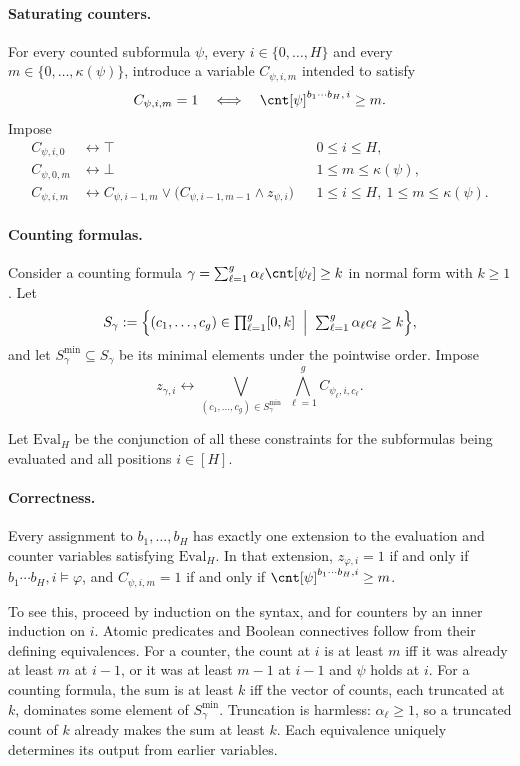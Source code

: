 \paragraph{Saturating counters.}
For every counted subformula $\psi$, every $i\in\{0,\ldots,H\}$ and every
$m\in\{0,\ldots,\kappa(\psi)\}$, introduce a variable $C_{\psi,i,m}$ intended to satisfy
\[
  C_{\psi,i,m}=1 \quad\Longleftrightarrow\quad \cnt[\psi]^{b_1\cdots b_H,\,i}\geq m.
\]
Impose
\begin{align*}
  C_{\psi,i,0} &\leftrightarrow \top && 0\leq i\leq H,\\
  C_{\psi,0,m} &\leftrightarrow \bot && 1\leq m\leq\kappa(\psi),\\
  C_{\psi,i,m} &\leftrightarrow C_{\psi,i-1,m}\lor\bigl(C_{\psi,i-1,m-1}\land z_{\psi,i}\bigr)
  && 1\leq i\leq H,\ 1\leq m\leq\kappa(\psi).
\end{align*}

\paragraph{Counting formulas.}
Consider a counting formula $\gamma=\sum_{\ell=1}^{g}\alpha_\ell\cnt[\psi_\ell]\geq k$ in normal
form with $k\geq 1$. Let
\[
  S_\gamma := \Bigl\{(c_1,\ldots,c_g)\in\textstyle\prod_{\ell=1}^{g}[0,k] \;\Bigm|\;
  \textstyle\sum_{\ell=1}^{g}\alpha_\ell c_\ell\geq k\Bigr\},
\]
and let $S^{\min}_\gamma\subseteq S_\gamma$ be its minimal elements under the pointwise order.
Impose
\begin{equation}\label{eq:bounded-crasp-count}
  z_{\gamma,i}\leftrightarrow
  \bigvee_{(c_1,\ldots,c_g)\in S^{\min}_\gamma}\ \bigwedge_{\ell=1}^{g} C_{\psi_\ell,i,c_\ell}.
\end{equation}

Let $\mathrm{Eval}_H$ be the conjunction of all these constraints for the subformulas being
evaluated and all positions $i\in[H]$.

\paragraph{Correctness.}
Every assignment to $b_1,\ldots,b_H$ has exactly one extension to the evaluation and counter
variables satisfying $\mathrm{Eval}_H$. In that extension, $z_{\varphi,i}=1$ if and only if
$b_1\cdots b_H,i\models\varphi$, and $C_{\psi,i,m}=1$ if and only if
$\cnt[\psi]^{b_1\cdots b_H,i}\geq m$.

To see this, proceed by induction on the syntax, and for counters by an inner induction on $i$.
Atomic predicates and Boolean connectives follow from their defining equivalences. For a
counter, the count at $i$ is at least $m$ iff it was already at least $m$ at $i-1$, or it was
at least $m-1$ at $i-1$ and $\psi$ holds at $i$. For a counting formula, the sum is at least $k$
iff the vector of counts, each truncated at $k$, dominates some element of $S^{\min}_\gamma$.
Truncation is harmless: $\alpha_\ell\geq 1$, so a truncated count of $k$ already makes the sum
at least $k$. Each equivalence uniquely determines its output from earlier variables.

